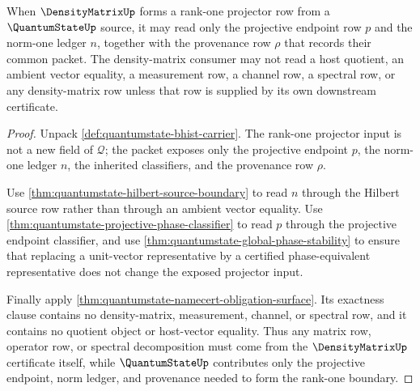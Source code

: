 \begin{theorem}
\label{thm:quantumstate-density-matrix-row-boundary}
When $\DensityMatrixUp$ forms a rank-one projector row from a
$\QuantumStateUp$ source, it may read only the projective endpoint row $p$ and
the norm-one ledger $n$, together with the provenance row $\rho$ that records
their common packet. The density-matrix consumer may not read a host quotient,
an ambient vector equality, a measurement row, a channel row, a spectral row,
or any density-matrix row unless that row is supplied by its own downstream
certificate.
\end{theorem}
\begin{proof}
Unpack \autoref{def:quantumstate-bhist-carrier}. The rank-one projector input
is not a new field of $\mathcal{Q}$; the packet exposes only the projective
endpoint $p$, the norm-one ledger $n$, the inherited classifiers, and the
provenance row $\rho$.

Use \autoref{thm:quantumstate-hilbert-source-boundary} to read $n$ through the
Hilbert source row rather than through an ambient vector equality. Use
\autoref{thm:quantumstate-projective-phase-classifier} to read $p$ through the
projective endpoint classifier, and use
\autoref{thm:quantumstate-global-phase-stability} to ensure that replacing a
unit-vector representative by a certified phase-equivalent representative does
not change the exposed projector input.

Finally apply
\autoref{thm:quantumstate-namecert-obligation-surface}. Its exactness clause
contains no density-matrix, measurement, channel, or spectral row, and it
contains no quotient object or host-vector equality. Thus any matrix row,
operator row, or spectral decomposition must come from the
$\DensityMatrixUp$ certificate itself, while $\QuantumStateUp$ contributes
only the projective endpoint, norm ledger, and provenance needed to form the
rank-one boundary.
\end{proof}

